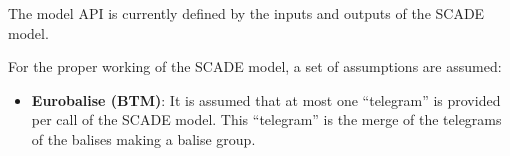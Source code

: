 The model API is currently defined by the inputs and outputs of the SCADE model.


For the proper working of the SCADE model, a set of assumptions are assumed:
\begin{itemize}
\item \textbf{Eurobalise (BTM)}: It is assumed that at most one
``telegram'' is provided per call of the SCADE model. This
``telegram'' is the merge of the telegrams of the balises making a
balise group.
\end{itemize}

